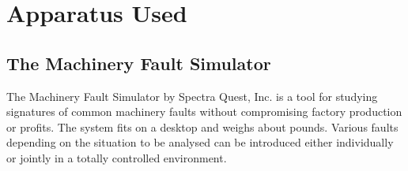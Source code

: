 \documentclass[a4paper,11pt]{report}
\begin{document}
	 
\clearpage
\appendix
\chapter{Apparatus Used}

\section{The Machinery Fault Simulator}
The Machinery Fault Simulator by Spectra Quest, Inc. is a tool for studying signatures of common machinery faults without compromising factory production or profits. The system fits on a desktop and weighs about \unit[130]{pounds}. Various faults depending on the situation to be analysed can be introduced either individually or jointly in a totally controlled environment.
\end{document}
